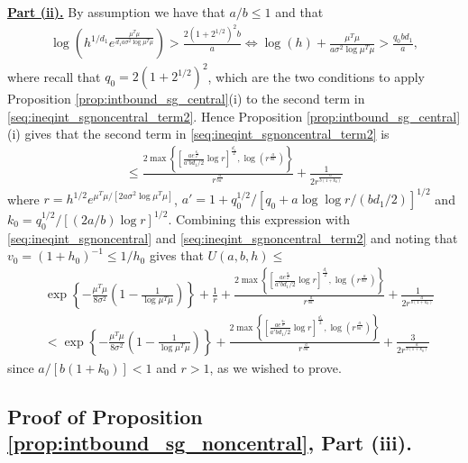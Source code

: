 \vspace{3mm}
\underline{{\bf Part (ii).}}
By assumption we have that $a/b \leq 1$ and that
\begin{align}
 \log \left( h^{1/d_1} e^{\frac{\mu^T\mu}{d_1 a \sigma^2 \log \mu^T\mu}} \right) > \frac{2 (1+2^{1/2})^2 b}{a}
\Leftrightarrow
 \log( h ) + \frac{\mu^T\mu}{a \sigma^2 \log \mu^T\mu} > \frac{q_0 b d_1}{a},
\nonumber
\end{align}
where recall that $q_0=2 (1+2^{1/2})^2$, which are the two conditions to apply Proposition \ref{prop:intbound_sg_central}(i) to the second term in \eqref{seq:ineqint_sgnoncentral_term2}.
Hence Proposition \ref{prop:intbound_sg_central}(i) gives that the second term in \eqref{seq:ineqint_sgnoncentral_term2} is
\begin{align}
 \leq \frac{2 \max \left\{ \left[ \frac{a e^{\frac{q_0}{a'}}}{a'b d_1/2} \log r \right]^{\frac{d_1}{2}} , \log \left( r^{\frac{a}{b a'}} \right)  \right\}}{r^{\frac{a}{b a'}}}
+ \frac{1}{2 r^{\frac{a}{b (1+k_0)}}}
\nonumber
\end{align}
where $r= h^{1/2} e^{\mu^T\mu/[2 a \sigma^2 \log \mu^T\mu]}$,
$a'= 1 + q_0^{1/2}/[q_0 + a \log \log r / (b d_1/2)]^{1/2}$ and
$k_0= q_0^{1/2}/[(2 a/b) \log r]^{1/2}$.
Combining this expression with \eqref{seq:ineqint_sgnoncentral} and \eqref{seq:ineqint_sgnoncentral_term2} and noting that $v_0= (1+h_0)^{-1} \leq 1/h_0$ gives that $U(a,b,h) \leq$
\begin{align}
 &\exp \left\{ -\frac{\mu^T\mu}{8\sigma^2} \left( 1 - \frac{1}{\log \mu^T\mu} \right)\right\} +
\frac{1}{r} +
\frac{2 \max \left\{ \left[ \frac{a e^{\frac{q_0}{a'}}}{a'b d_1/2} \log r \right]^{\frac{d_1}{2}} , \log \left( r^{\frac{a}{b a'}} \right)  \right\}}{r^{\frac{a}{b a'}}}
+ \frac{1}{2 r^{\frac{a}{b (1+k_0)}}}
\nonumber \\
&<
\exp \left\{ -\frac{\mu^T\mu}{8\sigma^2} \left( 1 - \frac{1}{\log \mu^T\mu} \right)\right\} +
\frac{2 \max \left\{ \left[ \frac{a e^{\frac{q_0}{a'}}}{a'b d_1/2} \log r \right]^{\frac{d_1}{2}} , \log \left( r^{\frac{a}{b a'}} \right)  \right\}}{r^{\frac{a}{b a'}}}
+ \frac{3}{2 r^{\frac{a}{b (1+k_0)}}}
\nonumber
\end{align}
since $a/[b(1+k_0)] < 1$ and $r>1$, as we wished to prove.


\subsection{Proof of Proposition \ref{prop:intbound_sg_noncentral}, Part (iii).}

